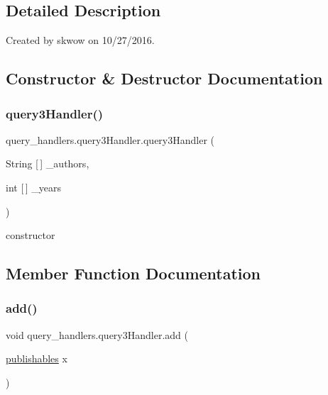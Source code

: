 \subsection{Detailed Description}
Created by skwow on 10/27/2016. 

\subsection{Constructor \& Destructor Documentation}
\hypertarget{classquery__handlers_1_1query3_handler_aa874c1b45238e159383eb3d7ebf7efaa}{}\label{classquery__handlers_1_1query3_handler_aa874c1b45238e159383eb3d7ebf7efaa} 
\subsubsection{\texorpdfstring{query3\+Handler()}{query3Handler()}}
{\footnotesize\ttfamily query\+\_\+handlers.\+query3\+Handler.\+query3\+Handler (\begin{DoxyParamCaption}\item[{String \mbox{[}$\,$\mbox{]}}]{\+\_\+authors,  }\item[{int \mbox{[}$\,$\mbox{]}}]{\+\_\+years }\end{DoxyParamCaption})}



constructor 



\subsection{Member Function Documentation}
\hypertarget{classquery__handlers_1_1query3_handler_a19b8a0235fc333924fdc0948ea8cf856}{}\label{classquery__handlers_1_1query3_handler_a19b8a0235fc333924fdc0948ea8cf856} 
\subsubsection{\texorpdfstring{add()}{add()}}
{\footnotesize\ttfamily void query\+\_\+handlers.\+query3\+Handler.\+add (\begin{DoxyParamCaption}\item[{\hyperlink{class_data_1_1publishables}{publishables}}]{x }\end{DoxyParamCaption})}

